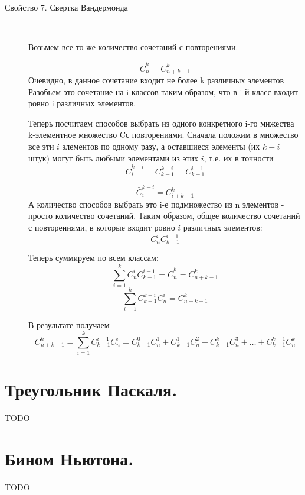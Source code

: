 \begin{description}
\item[Свойство 7. Свертка Вандермонда]~	

Возьмем все то же количество сочетаний с повторениями.

$$
\bar{C}_n^k = C_{n+k-1}^k
$$
Очевидно, в данное сочетание входит не более k различных элементов
Разобьем это сочетание на i классов таким образом, что в i-й класс входит 
ровно i различных элементов.

Теперь посчитаем способов выбрать из одного конкретного i-го мнжества 
k-элементное множество Cс повторениями. 
Сначала положим в множество все эти $i$ элементов по одному разу, а оставшиеся элементы (их $k-i$ штук) могут быть любыми элементами из этих $i$, т.е. их в точности 
$$
\bar{C}_i^{k-i} = C_{k-1}^{k-i} = C_{k-1}^{i-1}
$$

$$
\bar{C}_i^{k-i} = C_{i+k-1}^k
$$
А количество способов выбрать это i-е подмножество из n элементов - просто количество сочетаний. Таким образом, общее количество сочетаний с повторениями, в которые входит 
ровно $ i $ различных элементов:
$$
C_n^i C_{k-1}^{i-1}
$$

Теперь суммируем по всем классам:
$$
\sum\limits_{i=1}^k C_n^i C_{k-1}^{i-1} = \bar{C}_n^k = C_{n+k-1}^k
$$
$$
\sum\limits_{i = 1}^{k}  C_{k-1}^{k-i} C_n^i = C_{n+k-1}^k 
$$

В результате получаем
$$
C_{n+k-1}^k = \sum_{i = 1}^k C_{k-1}^{i-1} C_n^i = C_{k-1}^0 C_n^1 + C_{k-1}^1 C_n^2 + C_{k-1}^k C_n^3 + \ldots + C_{k-1}^{k-1} C_n^k
$$

\end{description}

\section{Треугольник Паскаля.}

TODO 

\section{Бином Ньютона.}

TODO 